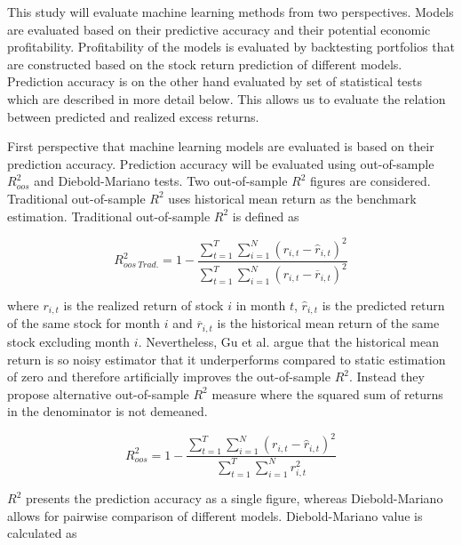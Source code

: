 \documentclass{article}
\begin{document}
This study will evaluate machine learning methods from two perspectives. Models are evaluated based on their predictive accuracy and their potential economic profitability. Profitability of the models is evaluated by backtesting portfolios that are constructed based on the stock return prediction of different models. Prediction accuracy is on the other hand evaluated by set of statistical tests which are described in more detail below. This allows us to evaluate the relation between predicted and realized excess returns. \par

First perspective that machine learning models are evaluated is  based on their prediction accuracy. Prediction accuracy will be evaluated using out-of-sample $R^{2}_{oos}$ and Diebold-Mariano tests. Two out-of-sample $R^{2}$ figures are considered. Traditional out-of-sample $R^{2}$ uses historical mean  return as the benchmark estimation. Traditional out-of-sample $R^{2}$ is defined as \par

\begin{equation}
\label{eq:r2Trad}
R^{2}_{oos \ Trad.} = 1 - \frac{\sum^T_{t=1} \sum^N_{i=1} (r_{i, t} - \hat r_{i, t})^2}{ \sum^T_{t=1} \sum^N_{i=1} (r_{i, t} - \overline{r}_{i, t} )^2}
\end{equation}

where $r_{i, t}$ is the realized return of stock $i$ in month $t$, $\hat r_{i, t}$ is the predicted return of the same stock for month $i$ and $\overline{r}_{i, t}$ is the historical mean return of the same stock excluding month $i$. Nevertheless, Gu et al. \citeyear{guetal} argue that the historical mean return is so noisy estimator that it underperforms compared to static estimation of zero and therefore artificially improves the out-of-sample $R^{2}$. Instead they propose alternative out-of-sample $R^{2}$ measure where the squared sum of returns in the denominator is not demeaned. \par

\begin{equation}
\label{eq:r2}
R^{2}_{oos} = 1 - \frac{\sum^T_{t=1} \sum^N_{i=1} (r_{i, t} - \hat r_{i, t})^2}{ \sum^T_{t=1} \sum^N_{i=1} r^2_{i, t}}
\end{equation}

$R^2$ presents the prediction accuracy as a single figure, whereas Diebold-Mariano allows for pairwise comparison of different models. Diebold-Mariano value is calculated as \par
\end{document}
